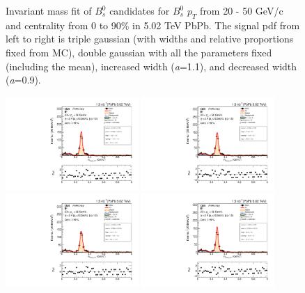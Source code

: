 \begin{figure}[hbtp]
\begin{center}
\caption{Invariant mass fit of $B^0_s$ candidates for $B^0_s$ $p_T$ from 20 - 50 GeV/c and centrality from 0 to 90\% in 5.02 TeV PbPb. The signal pdf from left to right is triple gaussian (with widths and relative proportions fixed from MC), double gaussian with all the parameters fixed (including the mean), increased width (\textit{a}=1.1), and decreased width (\textit{a}=0.9).}
\label{BsSigVar}
\end{center}
\end{figure}


\begin{figure}[hbtp]
\begin{center}
\includegraphics[width=0.45\textwidth]{Figures/Chapter5/data_PbPb_1_Bpt_2050_3gauss_doubly0_ntKp.pdf}
\includegraphics[width=0.45\textwidth]{Figures/Chapter5/data_PbPb_1_Bpt_2050_fixed_doubly0_ntKp.pdf}
\includegraphics[width=0.45\textwidth]{Figures/Chapter5/data_PbPb_1_Bpt_2050_scal+_doubly0_ntKp.pdf}
\includegraphics[width=0.45\textwidth]{Figures/Chapter5/data_PbPb_1_Bpt_2050_scal-_doubly0_ntKp.pdf}

\end{center}
\end{figure}
